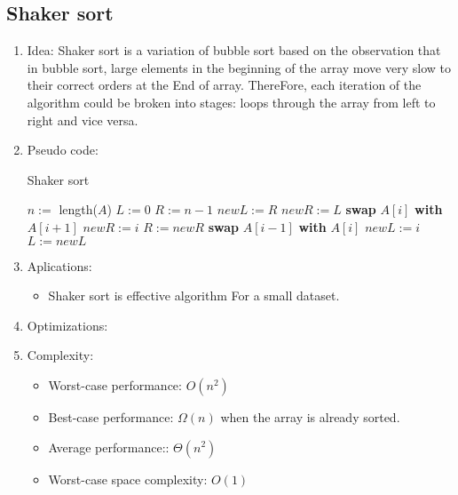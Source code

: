 \documentclass[12pt]{article}
\begin{document}
    \subsection{Shaker sort}
    \begin{enumerate}
        \item Idea: Shaker sort is a variation of bubble sort based on the observation that in bubble sort, large elements in the beginning of the array move very slow to their correct orders at the End of array. ThereFore, each iteration of the algorithm could be broken into stages: loops through the array from left to right and vice versa.
        \item Pseudo code:
        \begin{algorithm}[H]
            \caption{Shaker sort}
            \begin{algorithmic}[1]
                    \State $n:=$ length($A$)
                    \State $L:=0$
                    \State $R:=n-1$
                        \State $\textit{newL}:=R$
                        \State $\textit{newR}:=L$
                                \State \textbf{swap} $A[i]$ \textbf{with} $A[i+1]$
                                \State $\textit{newR}:=i$
                            \EndIf
                        \EndFor
                        \State $R:=\textit{newR}$
                                \State \textbf{swap} $A[i-1]$ \textbf{with} $A[i]$
                                \State $\textit{newL}:=i$
                            \EndIf
                        \EndFor
                        \State $L:=\textit{newL}$
                    \EndWhile
                \EndFunction
            \end{algorithmic}
        \end{algorithm}
        \item Aplications:
        \begin{itemize}
            \item Shaker sort is effective algorithm For a small dataset.
        \end{itemize}
        \item Optimizations:
        \item Complexity:
        \begin{itemize}
            \item Worst-case performance: $O(n^2)$
            \item Best-case performance: $\Omega(n)$ when the array is already sorted.
            \item Average performance:: $\Theta(n^2)$
            \item Worst-case space complexity: $O(1)$
        \end{itemize}
    \end{enumerate}
\end{document}
